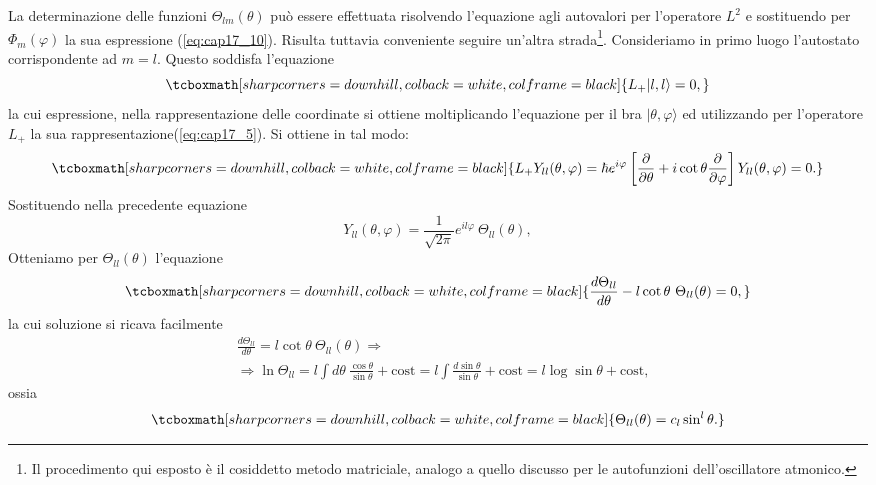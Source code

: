 La determinazione delle funzioni $\Theta _{lm} (\theta)$ può essere effettuata risolvendo l'equazione agli autovalori per l'operatore $L^2$ e sostituendo per $\Phi _m (\varphi)$ la sua espressione (\ref{eq:cap17_10}). Risulta tuttavia conveniente seguire un'altra strada\footnote{Il procedimento qui esposto è il cosiddetto metodo matriciale, analogo a quello discusso per le autofunzioni dell'oscillatore atmonico.}. Consideriamo in primo luogo l'autostato corrispondente ad $m=l$. Questo soddisfa l'equazione
	\begin{equation}
		\tcboxmath[sharp corners=downhill, colback=white, colframe=black]{
			L_+ \vert l,l\rangle =0,
			}
	\end{equation}
la cui espressione, nella rappresentazione delle coordinate si ottiene moltiplicando l'equazione per il bra $\vert \theta, \varphi \rangle$ ed utilizzando per  l'operatore $L_+$ la sua rappresentazione(\ref{eq:cap17_5}). Si ottiene in tal modo:
	\begin{equation}
		\tcboxmath[sharp corners=downhill, colback=white, colframe=black]{
			L_+Y_{ll}(\theta , \varphi ) = \hbar e^{i\varphi}\left[\frac{\partial}{\partial\theta}+i \cot\theta \frac{\partial}{\partial \varphi}\right]Y_{ll}(\theta , \varphi ) =0 .
			}
	\end{equation}
Sostituendo nella precedente equazione 
	\begin{equation}
		Y_{ll}(\theta , \varphi ) = \frac{1}{\sqrt{2\pi}}e^{il\varphi}\ \Theta _{ll} (\theta ) ,
	\end{equation}
Otteniamo per $\Theta _{ll} (\theta )$ l'equazione
	\begin{equation}
		\tcboxmath[sharp corners=downhill, colback=white, colframe=black]{
			\frac{d\Theta _{ll}}{d \theta}-l\cot\theta \ \Theta _{ll} (\theta )=0 ,
			}
	\end{equation}
la cui soluzione si ricava facilmente
	\begin{align}
	& \frac{d\Theta _{ll}}{d \theta}=l\cot\theta \ \Theta _{ll} (\theta ) \Rightarrow \nonumber \\
	& \Rightarrow \ln \Theta _{ll} = l \int d\theta \ \frac{\cos \theta}{\sin \theta}+ \textrm{cost} = l \int  \frac{d\sin \theta}{\sin \theta}+ \textrm{cost} = l \log \sin \theta + \textrm{cost} ,
	\end{align}
ossia
	\begin{equation}
		\tcboxmath[sharp corners=downhill, colback=white, colframe=black]{
			\Theta _{ll} (\theta )= c_l \sin ^l \theta .
			}
	\end{equation}
